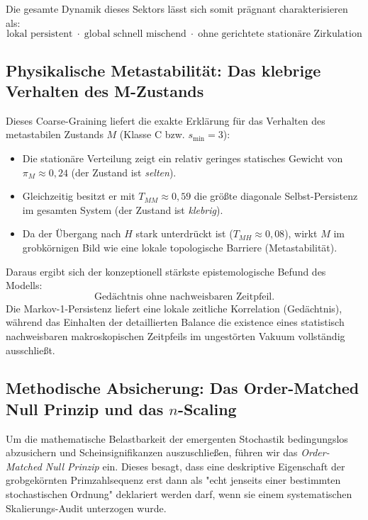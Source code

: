 \documentclass[11pt,a4paper]{article}
\theoremstyle{definition}
\begin{document}
	Die gesamte Dynamik dieses Sektors lässt sich somit prägnant charakterisieren als:
	\begin{equation}
		\boxed{\text{lokal persistent} \;\cdot\; \text{global schnell mischend} \;\cdot\; \text{ohne gerichtete stationäre Zirkulation}}
	\end{equation}
	
	\subsection{Physikalische Metastabilität: Das klebrige Verhalten des M-Zustands}
	Dieses Coarse-Graining liefert die exakte Erklärung für das Verhalten des metastabilen Zustands $M$ (Klasse C bzw. $s_{\min} = 3$):
	\begin{itemize}
		\item Die stationäre Verteilung zeigt ein relativ geringes statisches Gewicht von $\pi_M \approx 0{,}24$ (der Zustand ist \emph{selten}).
		\item Gleichzeitig besitzt er mit $T_{MM} \approx 0{,}59$ die größte diagonale Selbst-Persistenz im gesamten System (der Zustand ist \emph{klebrig}).
		\item Da der Übergang nach $H$ stark unterdrückt ist ($T_{MH} \approx 0{,}08$), wirkt $M$ im grobkörnigen Bild wie eine lokale topologische Barriere (Metastabilität).
	\end{itemize}
	
	Daraus ergibt sich der konzeptionell stärkste epistemologische Befund des Modells:
	\begin{equation}
		\boxed{\text{Gedächtnis ohne nachweisbaren Zeitpfeil.}}
	\end{equation}
	Die Markov-1-Persistenz liefert eine lokale zeitliche Korrelation (Gedächtnis), während das Einhalten der detaillierten Balance die existence eines statistisch nachweisbaren makroskopischen Zeitpfeils im ungestörten Vakuum vollständig ausschließt.
	
	\subsection{Methodische Absicherung: Das Order-Matched Null Prinzip und das $n$-Scaling}
	Um die mathematische Belastbarkeit der emergenten Stochastik bedingungslos abzusichern und Scheinsignifikanzen auszuschließen, führen wir das \emph{Order-Matched Null Prinzip} ein. Dieses besagt, dass eine deskriptive Eigenschaft der grobgekörnten Primzahlsequenz erst dann als "echt jenseits einer bestimmten stochastischen Ordnung" deklariert werden darf, wenn sie einem systematischen Skalierungs-Audit unterzogen wurde.
	
\end{document}
